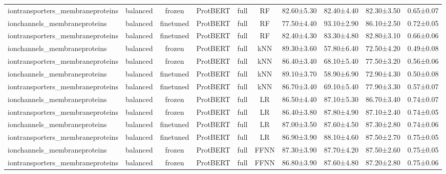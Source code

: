 \begin{tabular}{lcccccc}
iontransporters\_membraneproteins &   balanced &         frozen &     ProtBERT &      full &         RF &  82.60±5.30 &  82.40±4.40 &  82.30±3.50 & 0.65±0.07 \\
    ionchannels\_membraneproteins &   balanced &      finetuned &     ProtBERT &      full &         RF &  77.50±4.40 &  93.10±2.90 &  86.10±2.50 & 0.72±0.05 \\
iontransporters\_membraneproteins &   balanced &      finetuned &     ProtBERT &      full &         RF &  82.40±4.30 &  83.30±4.80 &  82.80±3.10 & 0.66±0.06 \\
    ionchannels\_membraneproteins &   balanced &         frozen &     ProtBERT &      full &        kNN &  89.30±3.60 &  57.80±6.40 &  72.50±4.20 & 0.49±0.08 \\
iontransporters\_membraneproteins &   balanced &         frozen &     ProtBERT &      full &        kNN &  86.40±3.40 &  68.10±5.40 &  77.50±3.20 & 0.56±0.06 \\
    ionchannels\_membraneproteins &   balanced &      finetuned &     ProtBERT &      full &        kNN &  89.10±3.70 &  58.90±6.90 &  72.90±4.30 & 0.50±0.08 \\
iontransporters\_membraneproteins &   balanced &      finetuned &     ProtBERT &      full &        kNN &  86.70±3.40 &  69.10±5.40 &  77.90±3.30 & 0.57±0.07 \\
    ionchannels\_membraneproteins &   balanced &         frozen &     ProtBERT &      full &         LR &  86.50±4.40 &  87.10±5.30 &  86.70±3.40 & 0.74±0.07 \\
iontransporters\_membraneproteins &   balanced &         frozen &     ProtBERT &      full &         LR &  86.40±3.80 &  87.80±4.90 &  87.10±2.40 & 0.74±0.05 \\
    ionchannels\_membraneproteins &   balanced &      finetuned &     ProtBERT &      full &         LR &  87.00±3.50 &  87.60±4.50 &  87.30±2.80 & 0.74±0.06 \\
iontransporters\_membraneproteins &   balanced &      finetuned &     ProtBERT &      full &         LR &  86.90±3.90 &  88.10±4.60 &  87.50±2.70 & 0.75±0.05 \\
    ionchannels\_membraneproteins &   balanced &         frozen &     ProtBERT &      full &       FFNN &  87.30±3.90 &  87.70±4.20 &  87.50±2.60 & 0.75±0.05 \\
iontransporters\_membraneproteins &   balanced &         frozen &     ProtBERT &      full &       FFNN &  86.80±3.90 &  87.60±4.80 &  87.20±2.80 & 0.75±0.06 \\

\end{tabular}
